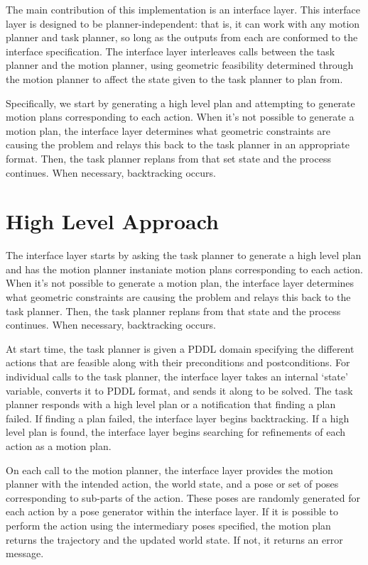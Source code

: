 \documentclass[12pt]{article}
\begin{document}
The main contribution of this implementation is an interface layer.  
This interface layer is designed to be planner-independent: that is, it can work with any motion planner and task planner, so long as the outputs from each are conformed to the interface specification.  
The interface layer interleaves calls between the task planner and the motion planner, using geometric feasibility determined through the motion planner to affect the state given to the task planner to plan from.

Specifically, we start by generating a high level plan and attempting to generate motion plans corresponding to each action.  
When it's not possible to generate a motion plan, the interface layer determines what geometric constraints are causing the problem and relays this back to the task planner in an appropriate format.  
Then, the task planner replans from that set state and the process continues.  
When necessary, backtracking occurs.



\section{High Level Approach}

The interface layer starts by asking the task planner to generate a high level plan and has the motion planner instaniate motion plans corresponding to each action.  
When it's not possible to generate a motion plan, the interface layer determines what geometric constraints are causing the problem and relays this back to the task planner.  
Then, the task planner replans from that state and the process continues.  
When necessary, backtracking occurs.
 
At start time, the task planner is given a PDDL domain specifying the different actions that are feasible along with their preconditions and postconditions.  
For individual calls to the task planner, the interface layer takes an internal `state' variable, converts it to PDDL format, and sends it along to be solved.  
The task planner responds with a high level plan or a notification that finding a plan failed.  
If finding a plan failed, the interface layer begins backtracking.  
If a high level plan is found, the interface layer begins searching for refinements of each action as a motion plan.

On each call to the motion planner, the interface layer provides the motion planner with the intended action, the world state, and a pose or set of poses  
corresponding to sub-parts of the action. These poses are randomly generated for each action by a pose generator within the interface layer. 
If it is possible to perform the action using the intermediary poses specified, the motion plan returns the trajectory and the updated world state.  
If not, it returns an error message.
\end{document}

